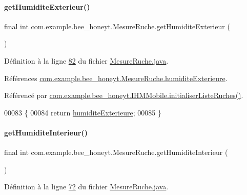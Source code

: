 \paragraph{\texorpdfstring{get\+Humidite\+Exterieur()}{getHumiditeExterieur()}}
{\footnotesize\ttfamily final int com.\+example.\+bee\+\_\+honeyt.\+Mesure\+Ruche.\+get\+Humidite\+Exterieur (\begin{DoxyParamCaption}{ }\end{DoxyParamCaption})}



Définition à la ligne \hyperlink{_mesure_ruche_8java_source_l00082}{82} du fichier \hyperlink{_mesure_ruche_8java_source}{Mesure\+Ruche.\+java}.



Références \hyperlink{_mesure_ruche_8java_source_l00020}{com.\+example.\+bee\+\_\+honeyt.\+Mesure\+Ruche.\+humidite\+Exterieure}.



Référencé par \hyperlink{_i_h_m_mobile_8java_source_l00170}{com.\+example.\+bee\+\_\+honeyt.\+I\+H\+M\+Mobile.\+initialiser\+Liste\+Ruches()}.


\begin{DoxyCode}
00083     \{
00084         \textcolor{keywordflow}{return} \hyperlink{classcom_1_1example_1_1bee__honeyt_1_1_mesure_ruche_aa5521e97dfa98051bff9fd8d3ca3f34d}{humiditeExterieure};
00085     \}
\end{DoxyCode}
\mbox{\label{classcom_1_1example_1_1bee__honeyt_1_1_mesure_ruche_af78ac1f237287bff4e1a36bebf8bbeef}} 
\paragraph{\texorpdfstring{get\+Humidite\+Interieur()}{getHumiditeInterieur()}}
{\footnotesize\ttfamily final int com.\+example.\+bee\+\_\+honeyt.\+Mesure\+Ruche.\+get\+Humidite\+Interieur (\begin{DoxyParamCaption}{ }\end{DoxyParamCaption})}



Définition à la ligne \hyperlink{_mesure_ruche_8java_source_l00072}{72} du fichier \hyperlink{_mesure_ruche_8java_source}{Mesure\+Ruche.\+java}.



